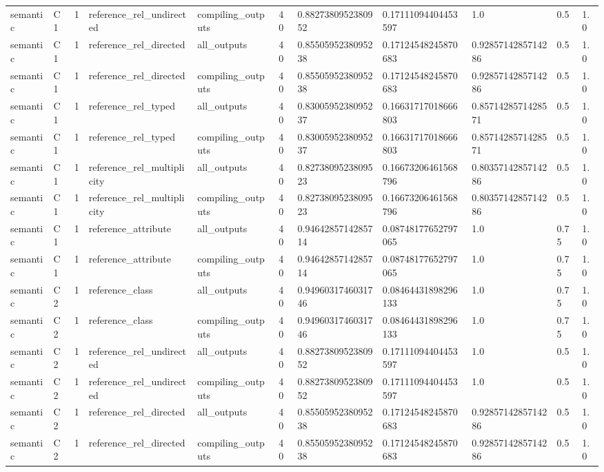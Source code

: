 \begin{tabular}{lllllllllll}
semantic & C1 & 1 & reference\_rel\_undirected & compiling\_outputs & 40 & 0.8827380952380952 & 0.17111094404453597 & 1.0 & 0.5 & 1.0 \\
semantic & C1 & 1 & reference\_rel\_directed & all\_outputs & 40 & 0.8550595238095238 & 0.17124548245870683 & 0.9285714285714286 & 0.5 & 1.0 \\
semantic & C1 & 1 & reference\_rel\_directed & compiling\_outputs & 40 & 0.8550595238095238 & 0.17124548245870683 & 0.9285714285714286 & 0.5 & 1.0 \\
semantic & C1 & 1 & reference\_rel\_typed & all\_outputs & 40 & 0.8300595238095237 & 0.16631717018666803 & 0.8571428571428571 & 0.5 & 1.0 \\
semantic & C1 & 1 & reference\_rel\_typed & compiling\_outputs & 40 & 0.8300595238095237 & 0.16631717018666803 & 0.8571428571428571 & 0.5 & 1.0 \\
semantic & C1 & 1 & reference\_rel\_multiplicity & all\_outputs & 40 & 0.8273809523809523 & 0.16673206461568796 & 0.8035714285714286 & 0.5 & 1.0 \\
semantic & C1 & 1 & reference\_rel\_multiplicity & compiling\_outputs & 40 & 0.8273809523809523 & 0.16673206461568796 & 0.8035714285714286 & 0.5 & 1.0 \\
semantic & C1 & 1 & reference\_attribute & all\_outputs & 40 & 0.9464285714285714 & 0.08748177652797065 & 1.0 & 0.75 & 1.0 \\
semantic & C1 & 1 & reference\_attribute & compiling\_outputs & 40 & 0.9464285714285714 & 0.08748177652797065 & 1.0 & 0.75 & 1.0 \\
semantic & C2 & 1 & reference\_class & all\_outputs & 40 & 0.9496031746031746 & 0.08464431898296133 & 1.0 & 0.75 & 1.0 \\
semantic & C2 & 1 & reference\_class & compiling\_outputs & 40 & 0.9496031746031746 & 0.08464431898296133 & 1.0 & 0.75 & 1.0 \\
semantic & C2 & 1 & reference\_rel\_undirected & all\_outputs & 40 & 0.8827380952380952 & 0.17111094404453597 & 1.0 & 0.5 & 1.0 \\
semantic & C2 & 1 & reference\_rel\_undirected & compiling\_outputs & 40 & 0.8827380952380952 & 0.17111094404453597 & 1.0 & 0.5 & 1.0 \\
semantic & C2 & 1 & reference\_rel\_directed & all\_outputs & 40 & 0.8550595238095238 & 0.17124548245870683 & 0.9285714285714286 & 0.5 & 1.0 \\
semantic & C2 & 1 & reference\_rel\_directed & compiling\_outputs & 40 & 0.8550595238095238 & 0.17124548245870683 & 0.9285714285714286 & 0.5 & 1.0 \\

\end{tabular}

